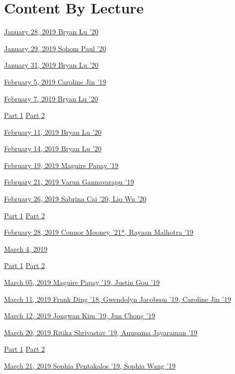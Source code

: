 \section*{Content By Lecture}
\small{
\hyperref[01-0128]{January 28, 2019 \dotfill Bryan Lu '20}

\hyperref[02-0129]{January 29, 2019 \dotfill Sohom Paul '20} 

\hyperref[03-0131]{January 31, 2019 \dotfill Bryan Lu '20} 

\hyperref[04-0205]{February 5, 2019 \dotfill Caroline Jin '19} 

\hyperref[05-0207-2]{February 7, 2019 \dotfill Bryan Lu '20}

\qquad \hyperref[05-0207-1]{Part 1} \qquad 
\hyperref[05-0207-2]{Part 2}

\hyperref[06-0211]{February 11, 2019 \dotfill Bryan Lu '20}

\hyperref[07-0214]{February 14, 2019 \dotfill Bryan Lu '20}

\hyperref[08-0219]{February 19, 2019 \dotfill Maguire Papay '19}

\hyperref[09-0221]{February 21, 2019 \dotfill Varun Gannavarapu '19}

\hyperref[11-0226-2]{February 26, 2019 \dotfill Sabrina Cai '20, Lio Wu '20}

\qquad \hyperref[11-0226-1]{Part 1} \qquad 
\hyperref[11-0226-2]{Part 2}

\hyperref[12-0228]{February 28, 2019 \dotfill \small{Connor Mooney '21*, Rayaan Malhotra '19}}

\hyperref[13-0304-2]{March 4, 2019 }

\qquad \hyperref[13-0304-1]{Part 1} \qquad 
\hyperref[13-0304-2]{Part 2} 

\hyperref[14-0305]{March 05, 2019 \dotfill Maguire Papay '19, Justin Gou '19}

\hyperref[16-0311]{March 11, 2019 \dotfill \footnotesize{Frank Ding '18, Gwendolyn Jacobson '19, Caroline Jin '19}}

\hyperref[17-0312]{March 12, 2019 \dotfill Jongwan Kim '19, Jun Chong '19}

\hyperref[20-0319-2]{March 20, 2019 \dotfill Ritika Shrivastav '19, Anupama Jayaraman '19}

\qquad \hyperref[20-0319-1]{Part 1} \qquad 
\hyperref[20-0319-2]{Part 2}

\hyperref[21-0321-2]{March 21, 2019 \dotfill Sophia Pentakalos '19, Sophia Wang '19}

}
